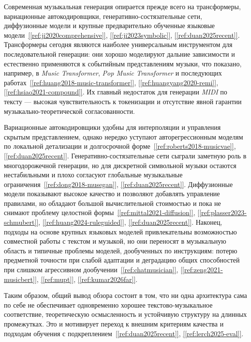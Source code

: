 \documentclass[a4paper,12pt]{extarticle}
\newcommand{\sourcecite}[1]{\hyperref[#1]{[\ref*{#1}]}}
\begin{document}
Современная музыкальная генерация опирается прежде всего на трансформеры, вариационные автокодировщики, генеративно-состязательные сети, диффузионные модели и крупные предварительно обученные языковые модели~\sourcecite{ref:ji2020comprehensive}, \sourcecite{ref:ji2023symbolic}, \sourcecite{ref:duan2025recent}. Трансформеры сегодня являются наиболее универсальным инструментом для последовательной генерации: они хорошо моделируют дальние зависимости и естественно применяются к событийным представлениям музыки, что показано, например, в \textit{Music Transformer}, \textit{Pop Music Transformer} и последующих работах~\sourcecite{ref:huang2018-music-transformer}, \sourcecite{ref:huangyang2020-remi}, \sourcecite{ref:hsiao2021-compound}. Их главный недостаток для генерации \textit{MIDI} по тексту --- высокая чувствительность к токенизации и отсутствие явной гарантии музыкально-теоретической согласованности.

Вариационные автокодировщики удобны для интерполяции и управления скрытым представлением, однако нередко уступают авторегрессионным моделям по локальной детализации и долгосрочной форме~\sourcecite{ref:roberts2018-musicvae}, \sourcecite{ref:duan2025recent}. Генеративно-состязательные сети сыграли заметную роль в многодорожечной генерации, но для дискретной символьной музыки остаются нестабильными и плохо согласуют глобальные музыкальные ограничения~\sourcecite{ref:dong2018-musegan}, \sourcecite{ref:duan2025recent}. Диффузионные модели показывают высокое качество и позволяют добавлять управление правилами, но обладают большой вычислительной стоимостью и пока не снимают проблему целостной формы~\sourcecite{ref:mittal2021-diffusion}, \sourcecite{ref:plasser2023-schmubert}, \sourcecite{ref:huang2024-ruleguided}, \sourcecite{ref:duan2025recent}. Наконец, подходы на основе крупных языковых моделей привлекательны возможностью совместной работы с текстом и музыкой, но они переносят в музыкальную область и типичные проблемы моделей, дообученных по инструкциям: потерю предметной точности при слабой адаптации и деградацию общих способностей при слишком агрессивном дообучении~\sourcecite{ref:chatmusician}, \sourcecite{ref:zeng2021-musicbert}, \sourcecite{ref:mupt}, \sourcecite{ref:kumar2026far}.

Таким образом, общий вывод обзора состоит в том, что ни одна архитектура сама по себе не обеспечивает одновременно хорошее текстово-музыкальное соответствие, теоретическую осмысленность и устойчивую структуру на длинных промежутках. Это и мотивирует переход к внешним критериям качества и подходам обучения с подкреплением~\sourcecite{ref:duan2025recent}, \sourcecite{ref:lerch2025-eval}.
\end{document}
